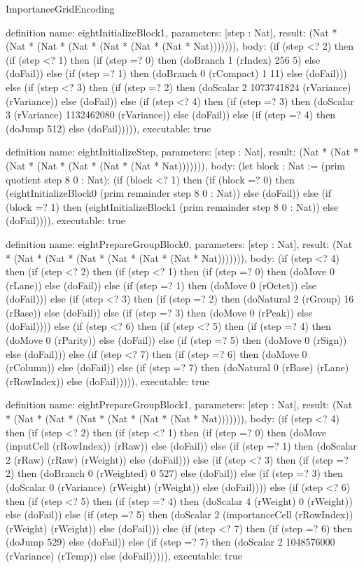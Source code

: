 \begin{lexlean}{ImportanceGridEncoding}
\begin{semanticmodule}
definition{
  name: eightInitializeBlock1,
  parameters: [step : Nat],
  result: (Nat * (Nat * (Nat * (Nat * (Nat * (Nat * (Nat * Nat))))))),
  body: (if (step <? 2) then
      (if (step <? 1) then
      (if (step =? 0) then (doBranch 1 (rIndex) 256 5) else (doFail)) else
      (if (step =? 1) then (doBranch 0 (rCompact) 1 11) else (doFail))) else
      (if (step <? 3) then
      (if (step =? 2) then (doScalar 2 1073741824 (rVariance) (rVariance)) else (doFail)) else
      (if (step <? 4) then
      (if (step =? 3) then (doScalar 3 (rVariance) 1132462080 (rVariance)) else (doFail)) else
      (if (step =? 4) then (doJump 512) else (doFail))))),
  executable: true
}

definition{
  name: eightInitializeStep,
  parameters: [step : Nat],
  result: (Nat * (Nat * (Nat * (Nat * (Nat * (Nat * (Nat * Nat))))))),
  body: (let block : Nat := (prim quotient step 8 0 : Nat); (if (block <? 1) then
      (if (block =? 0) then (eightInitializeBlock0 (prim remainder step 8 0 : Nat)) else (doFail)) else
      (if (block =? 1) then (eightInitializeBlock1 (prim remainder step 8 0 : Nat)) else (doFail)))),
  executable: true
}

definition{
  name: eightPrepareGroupBlock0,
  parameters: [step : Nat],
  result: (Nat * (Nat * (Nat * (Nat * (Nat * (Nat * (Nat * Nat))))))),
  body: (if (step <? 4) then
      (if (step <? 2) then
      (if (step <? 1) then
      (if (step =? 0) then (doMove 0 (rLane)) else (doFail)) else
      (if (step =? 1) then (doMove 0 (rOctet)) else (doFail))) else
      (if (step <? 3) then
      (if (step =? 2) then (doNatural 2 (rGroup) 16 (rBase)) else (doFail)) else
      (if (step =? 3) then (doMove 0 (rPeak)) else (doFail)))) else
      (if (step <? 6) then
      (if (step <? 5) then
      (if (step =? 4) then (doMove 0 (rParity)) else (doFail)) else
      (if (step =? 5) then (doMove 0 (rSign)) else (doFail))) else
      (if (step <? 7) then
      (if (step =? 6) then (doMove 0 (rColumn)) else (doFail)) else
      (if (step =? 7) then (doNatural 0 (rBase) (rLane) (rRowIndex)) else (doFail))))),
  executable: true
}

definition{
  name: eightPrepareGroupBlock1,
  parameters: [step : Nat],
  result: (Nat * (Nat * (Nat * (Nat * (Nat * (Nat * (Nat * Nat))))))),
  body: (if (step <? 4) then
      (if (step <? 2) then
      (if (step <? 1) then
      (if (step =? 0) then (doMove (inputCell (rRowIndex)) (rRaw)) else (doFail)) else
      (if (step =? 1) then (doScalar 2 (rRaw) (rRaw) (rWeight)) else (doFail))) else
      (if (step <? 3) then
      (if (step =? 2) then (doBranch 0 (rWeighted) 0 527) else (doFail)) else
      (if (step =? 3) then (doScalar 0 (rVariance) (rWeight) (rWeight)) else (doFail)))) else
      (if (step <? 6) then
      (if (step <? 5) then
      (if (step =? 4) then (doScalar 4 (rWeight) 0 (rWeight)) else (doFail)) else
      (if (step =? 5) then (doScalar 2 (importanceCell (rRowIndex)) (rWeight) (rWeight)) else (doFail))) else
      (if (step <? 7) then
      (if (step =? 6) then (doJump 529) else (doFail)) else
      (if (step =? 7) then (doScalar 2 1048576000 (rVariance) (rTemp)) else (doFail))))),
  executable: true
}


\end{semanticmodule}
\end{lexlean}
